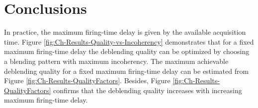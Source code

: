 			
			

\section{Conclusions}	\label{fig:Ch-Incoherency-Conclusions}
			

In practice, the maximum firing-time delay is given by the available acquisition time. Figure \ref{fig:Ch-Results-Quality-vs-Incoherency} demonstrates that for a fixed maximum firing-time delay the deblending quality can be optimized by choosing a blending pattern with maximum incoherency. The maximum achievable deblending quality for a fixed maximum firing-time delay can be estimated from Figure \ref{fig:Ch-Results-QualityFactors}. Besides, Figure \ref{fig:Ch-Results-QualityFactors} confirms that the deblending quality increases with increasing maximum firing-time delay. 































